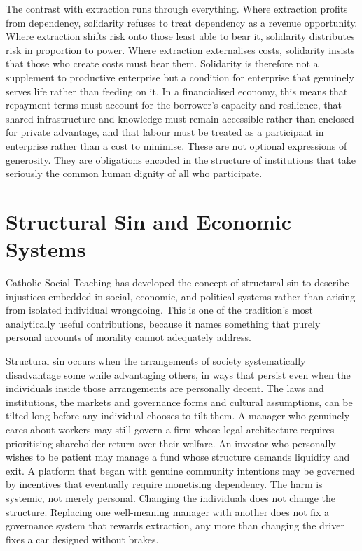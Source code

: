 \documentclass[11pt,a4paper,oneside]{book}
\begin{document}
The contrast with extraction runs through everything. Where extraction profits from dependency, solidarity refuses to treat dependency as a revenue opportunity. Where extraction shifts risk onto those least able to bear it, solidarity distributes risk in proportion to power. Where extraction externalises costs, solidarity insists that those who create costs must bear them. Solidarity is therefore not a supplement to productive enterprise but a condition for enterprise that genuinely serves life rather than feeding on it. In a financialised economy, this means that repayment terms must account for the borrower's capacity and resilience, that shared infrastructure and knowledge must remain accessible rather than enclosed for private advantage, and that labour must be treated as a participant in enterprise rather than a cost to minimise. These are not optional expressions of generosity. They are obligations encoded in the structure of institutions that take seriously the common human dignity of all who participate.

\section*{Structural Sin and Economic Systems}

Catholic Social Teaching has developed the concept of structural sin to describe injustices embedded in social, economic, and political systems rather than arising from isolated individual wrongdoing. This is one of the tradition's most analytically useful contributions, because it names something that purely personal accounts of morality cannot adequately address.

Structural sin occurs when the arrangements of society systematically disadvantage some while advantaging others, in ways that persist even when the individuals inside those arrangements are personally decent. The laws and institutions, the markets and governance forms and cultural assumptions, can be tilted long before any individual chooses to tilt them. A manager who genuinely cares about workers may still govern a firm whose legal architecture requires prioritising shareholder return over their welfare. An investor who personally wishes to be patient may manage a fund whose structure demands liquidity and exit. A platform that began with genuine community intentions may be governed by incentives that eventually require monetising dependency. The harm is systemic, not merely personal. Changing the individuals does not change the structure. Replacing one well-meaning manager with another does not fix a governance system that rewards extraction, any more than changing the driver fixes a car designed without brakes.
\end{document}
